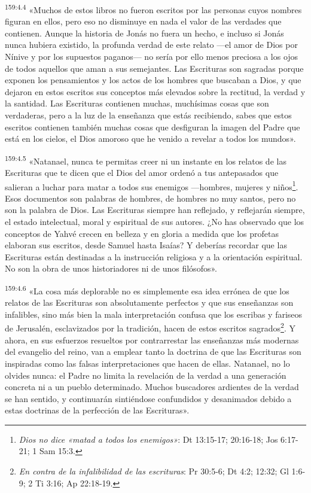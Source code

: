 \par
\textsuperscript{159:4.4} «Muchos de estos libros no fueron escritos por las personas cuyos nombres figuran en ellos, pero eso no disminuye en nada el valor de las verdades que contienen. Aunque la historia de Jonás no fuera un hecho, e incluso si Jonás nunca hubiera existido, la profunda verdad de este relato ---el amor de Dios por Nínive y por los supuestos paganos--- no sería por ello menos preciosa a los ojos de todos aquellos que aman a sus semejantes. Las Escrituras son sagradas porque exponen los pensamientos y los actos de los hombres que buscaban a Dios, y que dejaron en estos escritos sus conceptos más elevados sobre la rectitud, la verdad y la santidad. Las Escrituras contienen muchas, muchísimas cosas que son verdaderas, pero a la luz de la enseñanza que estás recibiendo, sabes que estos escritos contienen también muchas cosas que desfiguran la imagen del Padre que está en los cielos, el Dios amoroso que he venido a revelar a todos los mundos».

\par
\textsuperscript{159:4.5} «Natanael, nunca te permitas creer ni un instante en los relatos de las Escrituras que te dicen que el Dios del amor ordenó a tus antepasados que salieran a luchar para matar a todos sus enemigos ---hombres, mujeres y niños\footnote{\textit{Dios no dice «matad a todos los enemigos»}: Dt 13:15-17; 20:16-18; Jos 6:17-21; 1 Sam 15:3.}. Esos documentos son palabras de hombres, de hombres no muy santos, pero no son la palabra de Dios. Las Escrituras siempre han reflejado, y reflejarán siempre, el estado intelectual, moral y espiritual de sus autores. ¿No has observado que los conceptos de Yahvé crecen en belleza y en gloria a medida que los profetas elaboran sus escritos, desde Samuel hasta Isaías? Y deberías recordar que las Escrituras están destinadas a la instrucción religiosa y a la orientación espiritual. No son la obra de unos historiadores ni de unos filósofos».

\par
\textsuperscript{159:4.6} «La cosa más deplorable no es simplemente esa idea errónea de que los relatos de las Escrituras son absolutamente perfectos y que sus enseñanzas son infalibles, sino más bien la mala interpretación confusa que los escribas y fariseos de Jerusalén, esclavizados por la tradición, hacen de estos escritos sagrados\footnote{\textit{En contra de la infalibilidad de las escrituras}: Pr 30:5-6; Dt 4:2; 12:32; Gl 1:6-9; 2 Ti 3:16; Ap 22:18-19.}. Y ahora, en sus esfuerzos resueltos por contrarrestar las enseñanzas más modernas del evangelio del reino, van a emplear tanto la doctrina de que las Escrituras son inspiradas como las falsas interpretaciones que hacen de ellas. Natanael, no lo olvides nunca: el Padre no limita la revelación de la verdad a una generación concreta ni a un pueblo determinado. Muchos buscadores ardientes de la verdad se han sentido, y continuarán sintiéndose confundidos y desanimados debido a estas doctrinas de la perfección de las Escrituras».

